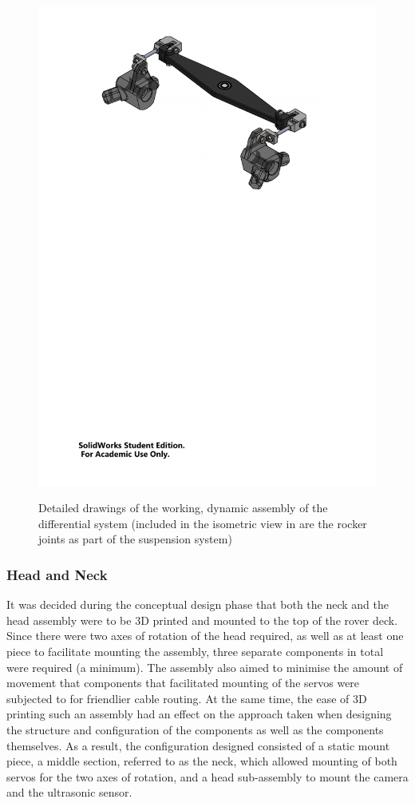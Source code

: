 \begin{figure}[h!]
{          \includegraphics[clip, trim=4cm 17cm 4cm 1cm, width=0.7\linewidth]{figures/diff-sub-iso}
        }
        \caption[Detailed drawings of the working, dynamic assembly of the differential system]{Detailed drawings of the working, dynamic assembly of the differential system (included in the isometric view in \protect{} are the rocker joints as part of the suspension system)}
        \label{fig:mechDesign-differentialSubDetail}
        \end{figure}
        
              
    \subsubsection{Head and Neck}
      It was decided during the conceptual design phase that both the neck and the head assembly were to be 3D printed and mounted to the top of the rover deck. Since there were two axes of rotation of the head required, as well as at least one piece to facilitate mounting the assembly, three separate components in total were required (a minimum). The assembly also aimed to minimise the amount of movement that components that facilitated mounting of the servos were subjected to for friendlier cable routing. At the same time, the ease of 3D printing such an assembly had an effect on the approach taken when designing the structure and configuration of the components as well as the components themselves. As a result, the configuration designed consisted of a static mount piece, a middle section, referred to as the neck, which allowed mounting of both servos for the two axes of rotation, and a head sub-assembly to mount the camera and the ultrasonic sensor.
      
